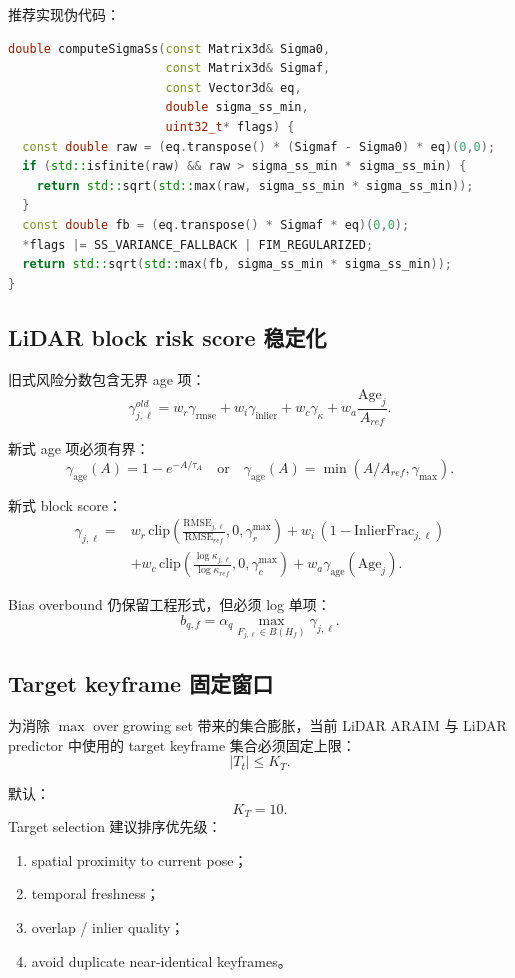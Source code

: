 \documentclass[11pt,a4paper]{article}
\begin{document}
推荐实现伪代码：
\begin{lstlisting}[language=C++]
double computeSigmaSs(const Matrix3d& Sigma0,
                      const Matrix3d& Sigmaf,
                      const Vector3d& eq,
                      double sigma_ss_min,
                      uint32_t* flags) {
  const double raw = (eq.transpose() * (Sigmaf - Sigma0) * eq)(0,0);
  if (std::isfinite(raw) && raw > sigma_ss_min * sigma_ss_min) {
    return std::sqrt(std::max(raw, sigma_ss_min * sigma_ss_min));
  }
  const double fb = (eq.transpose() * Sigmaf * eq)(0,0);
  *flags |= SS_VARIANCE_FALLBACK | FIM_REGULARIZED;
  return std::sqrt(std::max(fb, sigma_ss_min * sigma_ss_min));
}
\end{lstlisting}

\subsection{LiDAR block risk score 稳定化}

旧式风险分数包含无界 age 项：
\[
  \gamma_{j,\ell}^{old}
  =w_r\gamma_{\mathrm{rmse}}
  +w_i\gamma_{\mathrm{inlier}}
  +w_c\gamma_{\kappa}
  +w_a\frac{\mathrm{Age}_j}{A_{ref}}.
\]

新式 age 项必须有界：
\[
  \boxed{
    \gamma_{\mathrm{age}}(A)=1-e^{-A/\tau_A}
    \quad \text{or}\quad
    \gamma_{\mathrm{age}}(A)=\min(A/A_{ref},\gamma_{\max}).
  }
\]

新式 block score：
\[
\begin{aligned}
  \gamma_{j,\ell}
  ={}&
  w_r\,\mathrm{clip}\left(\frac{\mathrm{RMSE}_{j,\ell}}{\mathrm{RMSE}_{ref}},0,\gamma_r^{\max}\right)
  +w_i\,(1-\mathrm{InlierFrac}_{j,\ell}) \\
  &+w_c\,\mathrm{clip}\left(\frac{\log\kappa_{j,\ell}}{\log\kappa_{ref}},0,\gamma_c^{\max}\right)
  +w_a\gamma_{\mathrm{age}}(\mathrm{Age}_j).
\end{aligned}
\]

Bias overbound 仍保留工程形式，但必须 log 单项：
\[
  b_{q,f}=\alpha_q\max_{F_{j,\ell}\in B(H_f)}\gamma_{j,\ell}.
\]

\subsection{Target keyframe 固定窗口}

为消除 $\max$ over growing set 带来的集合膨胀，当前 LiDAR ARAIM 与 LiDAR predictor 中使用的 target keyframe 集合必须固定上限：
\[
  \boxed{|T_t|\le K_T.}
\]

默认：
\[
  K_T=10.
\]
Target selection 建议排序优先级：
\begin{enumerate}
  \item spatial proximity to current pose；
  \item temporal freshness；
  \item overlap / inlier quality；
  \item avoid duplicate near-identical keyframes。
\end{enumerate}
\end{document}
